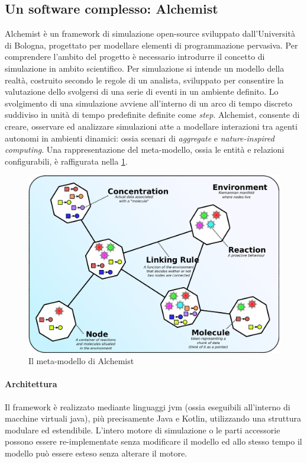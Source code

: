 \subsection{Un software complesso: Alchemist}\label{sec:alchemist}
Alchemist\cite{Pianini_2013} è un framework di simulazione open-source sviluppato dall'Università di Bologna, progettato per modellare elementi di programmazione pervasiva. Per comprendere l'ambito del progetto è necessario introdurre il concetto di simulazione in ambito scientifico. Per simulazione si intende un modello della realtà, costruito secondo le regole di un analista, sviluppato per consentire la valutazione dello svolgersi di una serie di eventi in un ambiente definito. Lo svolgimento di una simulazione avviene all'interno di un arco di tempo discreto suddiviso in unità di tempo predefinite definite come \textit{step}. Alchemist, consente di creare, osservare ed analizzare simulazioni atte a modellare interazioni tra agenti autonomi in ambienti dinamici: ossia scenari di \textit{aggregate} e \textit{nature-inspired computing}. Una rappresentazione del meta-modello, ossia le entità e relazioni configurabili, è raffigurata nella \cref{fig:alchemist-metamodel}.

\begin{figure}[htb]
	\centering
	\includegraphics[width=.9\linewidth]{figures/alchemist-metamodel.pdf}
	\caption{Il meta-modello di Alchemist}
	\label{fig:alchemist-metamodel}
\end{figure}

\paragraph{Architettura}
Il framework è realizzato mediante linguaggi \ac{jvm} (ossia eseguibili all'interno di macchine virtuali java), più precisamente Java e Kotlin, utilizzando una struttura modulare ed estendibile. L'intero motore di simulazione o le parti accessorie possono essere re-implementate senza modificare il modello ed allo stesso tempo il modello può essere esteso senza alterare il motore.

